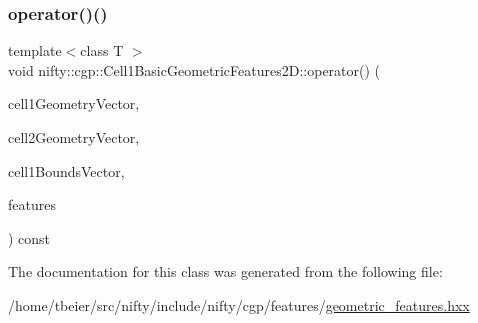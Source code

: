 \mbox{\label{classnifty_1_1cgp_1_1Cell1BasicGeometricFeatures2D_ab055a6b5bf3720dfc2e1a69cc8b1ddc8}} 
\subsubsection{\texorpdfstring{operator()()}{operator()()}}
{\footnotesize\ttfamily template$<$class T $>$ \\
void nifty\+::cgp\+::\+Cell1\+Basic\+Geometric\+Features2\+D\+::operator() (\begin{DoxyParamCaption}\item[{const \hyperlink{classnifty_1_1cgp_1_1CellGeometryVector}{Cell\+Geometry\+Vector}$<$ 2, 1 $>$ \&}]{cell1\+Geometry\+Vector,  }\item[{const \hyperlink{classnifty_1_1cgp_1_1CellGeometryVector}{Cell\+Geometry\+Vector}$<$ 2, 2 $>$ \&}]{cell2\+Geometry\+Vector,  }\item[{const \hyperlink{classnifty_1_1cgp_1_1CellBoundsVector}{Cell\+Bounds\+Vector}$<$ 2, 1 $>$ \&}]{cell1\+Bounds\+Vector,  }\item[{\hyperlink{classandres_1_1View}{nifty\+::marray\+::\+View}$<$ T $>$ \&}]{features }\end{DoxyParamCaption}) const\hspace{0.3cm}{\ttfamily [inline]}}



The documentation for this class was generated from the following file\+:\begin{DoxyCompactItemize}
\item 
/home/tbeier/src/nifty/include/nifty/cgp/features/\hyperlink{geometric__features_8hxx}{geometric\+\_\+features.\+hxx}\end{DoxyCompactItemize}
